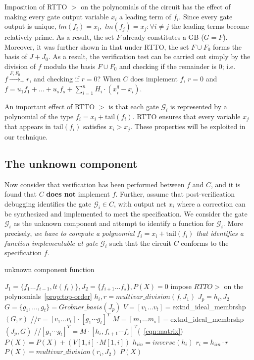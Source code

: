 Imposition of RTTO $>$ on the polynomials of the circuit has the
effect of making every gate output variable $x_i$ a leading term of
$f_i$. Since every gate output is unique, $lm(f_i)=x_i,$ $lm(f_j)=x_j
:\forall i\neq j$ the leading terms become relatively prime. As a result, the set $F$ 
already constitutes a GB ($G=F$). Moreover, it was further shown in
\cite{lv:tcad2013} that under RTTO, the set $F \cup F_0$ forms the
\Grobner basis of $J + J_0$. As a result, the verification test
can be carried out simply by the division of $f$ modulo the \Grobner
basis $F\cup F_0$ and checking if the remainder is 0; i.e. $f
\xrightarrow{F,F_0}_+r$, and checking if $r = 0$? When $C$ does
implement $f$, $r=0$ and $f = u_1f_1+\dots+u_sf_s + \sum_{i=1}^n
H_i\cdot(x_i^q-x_i)$. 

An important effect of RTTO $>$ is that each gate $\mathcal{G}_i$ is
represented by a polynomial of the type $f_i = x_i +
\text{tail}(f_i)$.  RTTO ensures that
every variable $x_j$ that appears in $\text{tail}(f_i)$ satisfies
$x_i>x_j$. These properties will be exploited in our technique. 

\subsection{The unknown component}
Now consider that verification has been performed between $f$ and $C$,
and it is found that $C$ {\bf does not} implement $f$. Further, assume
that post-verification debugging identifies the gate $\mathcal{G}_i
\in C$, with output net $x_i$ where a correction can be synthesized and
implemented to meet the specification. We consider the gate
$\mathcal{G}_i$ as the unknown component and attempt to identify a
function for $\mathcal{G}_i$. More precisely, {\it we have to compute
  a polynomial $f_i = x_i + \text{tail}(f_i)$ that identifies a
  function implementable at gate $\mathcal{G}_i$} such that the
circuit $C$ conforms to the specification $f$. 

\begin{algorithm}
\caption{unknown component function}\label{pseudouc}
\begin{algorithmic}[1]
\State $J_1=\{f_1\dots f_{i-1},lt(f_i)\},J_2=\{f_{i+1}\dots f_s\},P(X)=0$
\State impose $RTTO >$ on the polynomials~\ref{prop:top-order}
\State $h_i,r = multivar\_division(f,J_1)$
\State $J_p = h_i,J_2$
\State $G=\{g_1,\dots,g_t\}=Grobner\_basis(J_p)$
\State $V=[v_1\dots v_t]=$extnd\_ideal\_membrshp$(G,r)$ //$r=[v_1\dots v_t]\cdot[g_1\cdots g_t]^T$
\State $M=[m_1\dots m_s]=$extnd\_ideal\_membrshp$(J_p,G)$ //$[g_1\cdots g_t]^T = M\cdot[h_i,f_{i+1}\cdots f_s]^T$(~\autoref{eqn:matrix})
\State $P(X) = P(X)+(V[1,i]\cdot M[1,i])$
\EndFor
\Else
\State $h_{iin}=inverse(h_i)$
\State $r_i=h_{iin}\cdot r$
\State $P(X)=multivar\_division(r_i,J_2)$
\EndIf
\State \Return $P(X)$
\EndProcedure
\end{algorithmic}
\end{algorithm}

